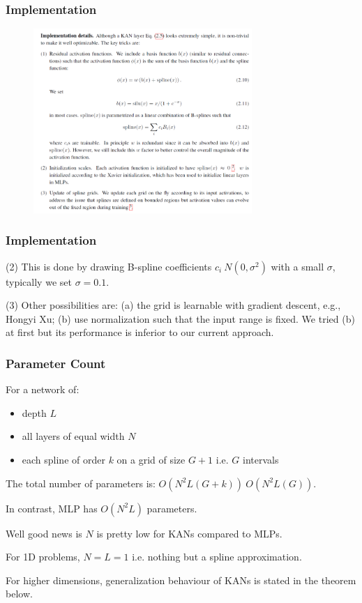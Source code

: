 \documentclass[serif, aspectratio=169]{beamer}
\begin{document}
\begin{frame}
    \frametitle<presentation>{Implementation}
    \begin{figure}
        \centering
        \includegraphics[height=7cm]{image copy 13.png}
    \end{figure}
\end{frame}
\begin{frame}
    \frametitle<presentation>{Implementation}
    (2) This is done by drawing B-spline coefficients $c_i ~ N(0, \sigma^2 )$ with a small $\sigma$, typically we set $\sigma = 0.1$.

    (3) Other possibilities are: (a) the grid is learnable with gradient descent, e.g., Hongyi Xu; (b) use normalization such
    that the input range is fixed. We tried (b) at first but its performance is inferior to our current approach.
\end{frame}\begin{frame}
    \frametitle<presentation>{Parameter Count}
    For a network of:
    \begin{itemize}
        \item depth $L$
        \item all layers of equal width $N$
        \item each spline of order $k$ on a grid of size $G+1$ i.e. $G$ intervals
    \end{itemize}
    The total number of parameters is: $O(N^2L(G+k)) ~ O(N^2L(G))$.

    In contrast, MLP has $O(N^2L)$ parameters.

    Well good news is $N$ is pretty low for KANs compared to MLPs.

    For 1D problems, $N=L=1$ i.e. nothing but a spline approximation.

    For higher dimensions, generalization behaviour of KANs is stated in the theorem below.
\end{frame}
\end{document}
